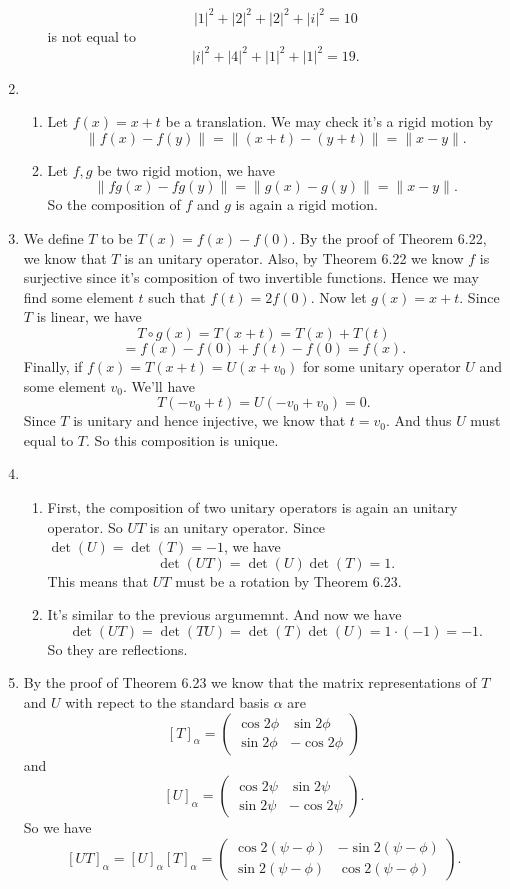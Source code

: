 \begin{enumerate}
\begin{enumerate}
\[|1|^2+|2|^2+|2|^2+|i|^2=10\]
is not equal to 
\[|i|^2+|4|^2+|1|^2+|1|^2=19.\]
\end{enumerate}
\item \begin{enumerate}
\item Let $f(x)=x+t$ be a translation. We may check it's a rigid motion by 
\[\|f(x)-f(y)\|=\|(x+t)-(y+t)\|=\|x-y\|.\]
\item Let $f,g$ be two rigid motion, we have 
\[\|fg(x)-fg(y)\|=\|g(x)-g(y)\|=\|x-y\|.\]
So the composition of $f$ and $g$ is again a rigid motion.
\end{enumerate}
\item We define $T$ to be $T(x)=f(x)-f(0)$. By the proof of Theorem 6.22, we know that $T$ is an unitary operator. Also, by Theorem 6.22 we know $f$ is surjective since it's composition of two invertible functions. Hence we may find some element $t$ such that $f(t)=2f(0)$. Now let $g(x)=x+t$. Since $T$ is linear, we have 
\[T\circ g(x)=T(x+t)=T(x)+T(t)\]
\[=f(x)-f(0)+f(t)-f(0)=f(x).\]
Finally, if $f(x)=T(x+t)=U(x+v_0)$ for some unitary operator $U$ and some element $v_0$. We'll have 
\[T(-v_0+t)=U(-v_0+v_0)=0.\]
Since $T$ is unitary and hence injective, we know that $t=v_0$. And thus $U$ must equal to $T$. So this composition is unique.
\item \begin{enumerate}
\item First, the composition of two unitary operators is again an unitary operator. So $UT$ is an unitary operator. Since $\det(U)=\det(T)=-1$, we have 
\[\det(UT)=\det(U)\det(T)=1.\]
This means that $UT$ must be a rotation by Theorem 6.23.
\item It's similar to the previous argumemnt. And now we have 
\[\det(UT)=\det(TU)=\det(T)\det(U)=1\cdot (-1)=-1.\]
So they are reflections.
\end{enumerate}
\item By the proof of Theorem 6.23 we know that the matrix representations of $T$ and $U$ with repect to the standard basis $\alpha $ are 
\[[T]_{\alpha}=\begin{pmatrix}\cos 2\phi &\sin 2\phi \\\sin 2\phi &-\cos 2\phi \end{pmatrix}\]
and 
\[[U]_{\alpha}=\begin{pmatrix}\cos 2\psi &\sin 2\psi \\\sin 2\psi &-\cos 2\psi \end{pmatrix}.\]
So we have 
\[[UT]_{\alpha}=[U]_{\alpha}[T]_{\alpha}=\begin{pmatrix}\cos 2(\psi-\phi) &-\sin 2(\psi-\phi) \\\sin 2(\psi-\phi) &\cos 2(\psi-\phi) \end{pmatrix}.\]

\end{enumerate}
